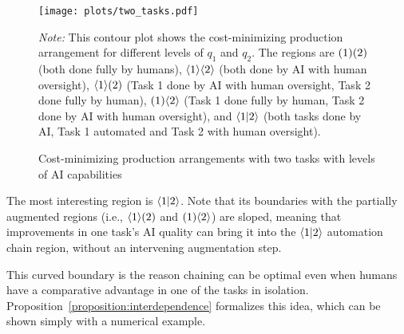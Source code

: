 \documentclass{article}
\theoremstyle{plain}
\theoremstyle{plain}
\begin{document}
\begin{figure}[h!]
  \caption{Cost-minimizing production arrangements with two tasks with levels of AI capabilities} \label{fig:two_tasks}
  \begin{center}
  \texttt{[image: plots/two\_tasks.pdf]} \\
  \end{center}
\begin{footnotesize}
  \emph{Note:} This contour plot shows the cost-minimizing production arrangement for different levels of \(q_1\) and \(q_2\).
  The regions are \(( 1 )( 2 )\) (both done fully by humans), \(\langle 1 \rangle\langle 2 \rangle\) (both done by AI with human oversight), \(\langle 1 \rangle( 2 )\) (Task 1 done by AI with human oversight, Task 2 done fully by human), \(( 1 )\langle 2 \rangle\) (Task 1 done fully by human, Task 2 done by AI with human oversight), and \(\langle 1|2 \rangle\) (both tasks done by AI, Task 1 automated and Task 2 with human oversight).
\end{footnotesize}
\end{figure}

The most interesting region is \(\langle 1|2 \rangle\).
Note that its boundaries with the partially augmented regions (i.e., \(\langle 1 \rangle( 2 )\) and \(( 1 )\langle 2 \rangle\)) are sloped, meaning that improvements in one task's AI quality can bring it into the \(\langle 1|2 \rangle\) automation chain region, without an intervening augmentation step.

This curved boundary is the reason chaining can be optimal even when humans have a comparative advantage in one of the tasks in isolation.
Proposition~\ref{proposition:interdependence} formalizes this idea, which can be shown simply with a numerical example.
\end{document}
